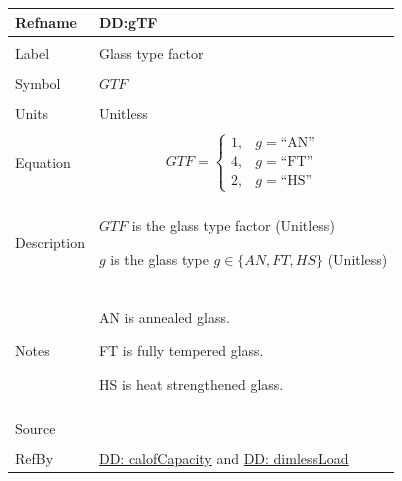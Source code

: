 \documentclass[12pt]{article}
\begin{document}
\noindent \begin{minipage}{\textwidth}
\begin{tabular}{>{\raggedright}p{}>{\raggedright\arraybackslash}p{}}
\toprule \textbf{Refname} & \textbf{DD:gTF}
\label{DD:gTF}
\\ \midrule \\
Label & Glass type factor
        
\\ \midrule \\
Symbol & $GTF$
         
\\ \midrule \\
Units & Unitless
        
\\ \midrule \\
Equation & \begin{displaymath}
           GTF=\begin{cases}
               1, & g=\text{``AN''}\\
4, & g=\text{``FT''}\\
2, & g=\text{``HS''}
               \end{cases}
           \end{displaymath}
\\ \midrule \\
Description & \begin{symbDescription}
              \item{$GTF$ is the glass type factor (Unitless)}
              \item{$g$ is the glass type $g\in{}\{AN,FT,HS\}$ (Unitless)}
              \end{symbDescription}
\\ \midrule \\
Notes & AN is annealed glass.
        
        FT is fully tempered glass.
        
        HS is heat strengthened glass.
        
\\ \midrule \\
Source & \cite{astm2009}
         
\\ \midrule \\
RefBy & \hyperref[DD:calofCapacity]{DD: calofCapacity} and \hyperref[DD:dimlessLoad]{DD: dimlessLoad}
        
\\ \bottomrule
\end{tabular}
\end{minipage}
\end{document}
